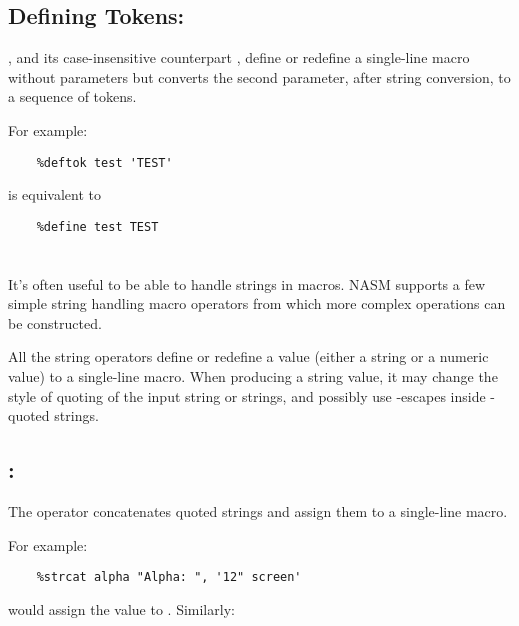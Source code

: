 \subsection{Defining Tokens: }
\label{subsec:deftok}

, and its case-insensitive counterpart ,
define or redefine a single-line macro without parameters but converts
the second parameter, after string conversion, to a sequence of tokens.

For example:

\begin{lstlisting}
	%deftok test 'TEST'
\end{lstlisting}

is equivalent to

\begin{lstlisting}
	%define test TEST
\end{lstlisting}

\section{}
\label{sec:strlen}

It's often useful to be able to handle strings in macros. NASM
supports a few simple string handling macro operators from which
more complex operations can be constructed.

All the string operators define or redefine a value (either a string
or a numeric value) to a single-line macro. When producing a string
value, it may change the style of quoting of the input string or
strings, and possibly use \code{\textbackslash}-escapes inside
-quoted strings.

\subsection{: }
\label{subsec:strcat}

The  operator concatenates quoted strings and assign
them to a single-line macro.

For example:

\begin{lstlisting}
    %strcat alpha "Alpha: ", '12" screen'
\end{lstlisting}

would assign the value  to .
Similarly:

